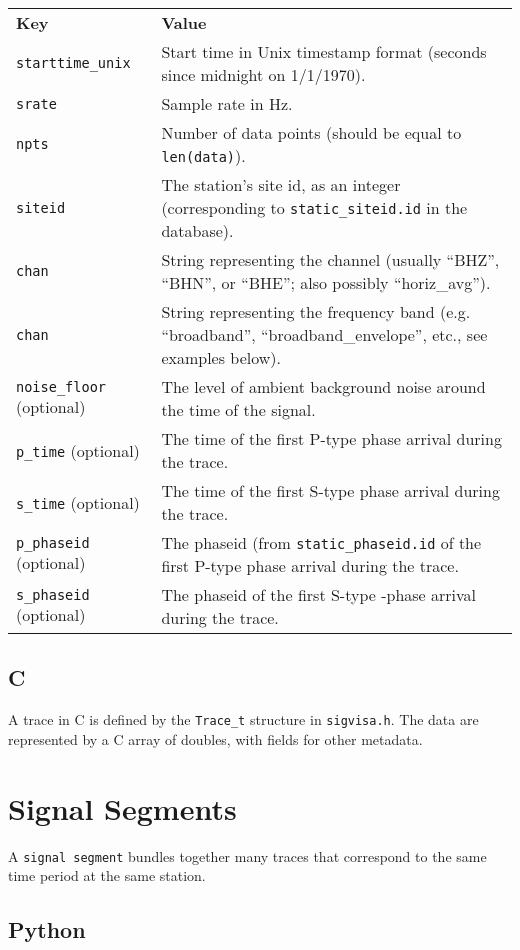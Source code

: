 \documentclass{article}
\begin{document}
\begin{tabular}{lp{4in}}
{\bf Key} & {\bf Value}\\
{\tt starttime\_unix} & Start time in Unix timestamp format (seconds since midnight on 1/1/1970). \\
{\tt srate} & Sample rate in Hz.\\
{\tt npts} & Number of data points (should be equal to {\tt len(data)}). \\
{\tt siteid} & The station's site id, as an integer (corresponding to {\tt static\_siteid.id} in the database).\\
{\tt chan} & String representing the channel (usually ``BHZ'', ``BHN'', or ``BHE''; also possibly ``horiz\_avg'').\\
{\tt chan} & String representing the frequency band (e.g. ``broadband'', ``broadband\_envelope'', etc., see examples below).\\
{\tt noise\_floor} (optional) & The level of ambient background noise around the time of the signal. \\
{\tt p\_time} (optional) & The time of the first P-type phase arrival during the trace.\\
{\tt s\_time} (optional) & The time of the first S-type phase arrival during the trace.\\
{\tt p\_phaseid} (optional) & The phaseid (from {\tt static\_phaseid.id} of the first P-type phase arrival during the trace.\\
{\tt s\_phaseid} (optional) & The phaseid of the first S-type -phase arrival during the trace.
\end{tabular}

\subsection{C}

A trace in C is defined by the {\tt Trace\_t} structure in {\tt sigvisa.h}. The data are represented by a C array of doubles, with fields for other metadata.

\section{Signal Segments}

A {\tt signal segment} bundles together many traces that correspond to the same time period at the same station. 

\subsection{Python}
\end{document}
